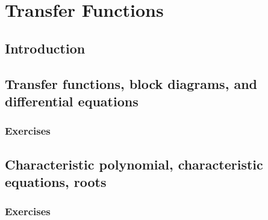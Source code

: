 \chapter{Transfer Functions}
\section{Introduction}
\section{Transfer functions, block diagrams, and differential equations}
\subsection{Exercises}
\section{Characteristic polynomial, characteristic equations, roots}
\subsection{Exercises}
